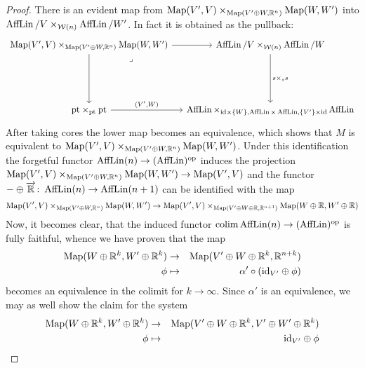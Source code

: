 \begin{proof}
    There is an evident map from
    $\operatorname{Map}(V',V) \times_{\operatorname{Map}(V'\oplus W,\mathbb{R}^n)} \operatorname{Map}(W,W')$
    into $\operatorname{AffLin}/V \times_{{\mathcal W(n)}} \operatorname{AffLin}/W'$. In fact it is obtained
    as the pullback:
    \[\begin{tikzcd}[column sep=tiny]
        {\Map(V',V)\times_{\Map(V'\oplus W,\R^n)}\Map(W,W')} && {\cO/V \times_{{\mathcal W(n)}}\cO/W} \\
        \\
        \\
        {\pt \times_{\pt} \pt} && {\cO \times_{\id\times\{W\},\cO \times \cO,\{V'\}\times\id}\cO}
        \arrow[from=1-1, to=4-1]
        \arrow["{(V',W)}", from=4-1, to=4-3]
        \arrow["{s\times_ss}", from=1-3, to=4-3]
        \arrow[from=1-1, to=1-3]
        \arrow["\lrcorner"{anchor=center, pos=0.125}, draw=none, from=1-1, to=4-3]
      \end{tikzcd}\]
    After taking cores the lower map becomes an equivalence, which shows that
    $M$ is equivalent to $\operatorname{Map}(V',V) \times_{\operatorname{Map}(V'\oplus W,\mathbb{R}^n)} \operatorname{Map}(W,W')$.
    Under this identification the forgetful functor $\operatorname{AffLin}(n) \to (\operatorname{AffLin})^{\mathrm{op}}$
    induces the projection $\operatorname{Map}(V',V) \times_{\operatorname{Map}(V'\oplus W,\mathbb{R}^n)} \operatorname{Map}(W,W') \to \operatorname{Map}(V',V)$
    and the functor $-\oplus \overrightarrow{\mathbb{R}} \colon \operatorname{AffLin}(n) \to \operatorname{AffLin}(n+1)$
    can be identified with the map
    \[
      \operatorname{Map}(V',V) \times_{\operatorname{Map}(V'\oplus W,\mathbb{R}^n)} \operatorname{Map}(W,W') \to
      \operatorname{Map}(V',V) \times_{\operatorname{Map}(V'\oplus W \oplus \mathbb{R},\mathbb{R}^{n+1})} \operatorname{Map}(W\oplus \mathbb{R},W'\oplus \mathbb{R})
    \]
    Now, it becomes clear, that the induced functor
    $\operatorname*{colim} \operatorname{AffLin}(n) \to (\operatorname{AffLin})^{\mathrm{op}}$ is fully faithful,
    whence we have proven that the map
    \begin{eqnarray*}
      \operatorname{Map}(W\oplus \mathbb{R}^k, W' \oplus \mathbb{R}^k) &\to& \operatorname{Map}(V' \oplus W \oplus \mathbb{R}^k, \mathbb{R}^{n+k}) \\
      \phi &\mapsto & \alpha' \circ (\mathrm{id}_{V'} \oplus \phi)
    \end{eqnarray*}
    becomes an equivalence in the colimit for $k \to \infty$.
    Since $\alpha'$ is an equivalence, we may as well show the claim for the system
    \begin{eqnarray*}
      \operatorname{Map}(W\oplus \mathbb{R}^k, W' \oplus \mathbb{R}^k) &\to&
      \operatorname{Map}(V' \oplus W \oplus \mathbb{R}^k, V' \oplus W' \oplus \mathbb{R}^k) \\
      \phi &\mapsto & \mathrm{id}_{V'} \oplus \phi
    \end{eqnarray*}
  

\end{proof}
